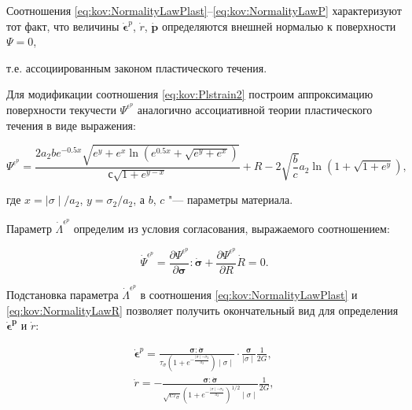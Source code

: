 Соотношения  \eqref{eq:kov:NormalityLawPlast}--\eqref{eq:kov:NormalityLawP} характеризуют тот факт, что величины $\boldsymbol{\dot{\epsilon}}^{p}$, $\dot{r}$, $\dot{\boldsymbol{p}}$  определяются внешней нормалью к поверхности $\Psi=0$,

т.е. ассоциированным законом пластического течения.



Для модификации соотношения \eqref{eq:kov:Plstrain2} построим аппроксимацию поверхности текучести $\Psi^{\epsilon^p}$ аналогично ассоциативной теории пластического течения \cite{kostina:bib:MurakamiB} в виде выражения:

$$

\Psi^{\epsilon^p}=\frac{2{a}_{2}b{e}^{-0.5x}\sqrt{{e}^{y}+{e}^{x}\ln \left({e}^{0.5x}+\sqrt{{e}^{y}+{e}^{x}} \right)}}{с\sqrt{1+{e}^{y-x}}}+R-2\sqrt{\frac{b}{c}}{a}_{2}\ln \left(1+\sqrt{1+{e}^{y}} \right), \label{eq:kov:Psiep}

$$

где $x=\mid \sigma \mid /{a}_{2}$, $y=\sigma_{2}/{a}_{2}$, а $b$, $c$ "--- параметры материала.



Параметр $\dot{\Lambda}^{\epsilon^p}$ определим из условия согласования, выражаемого соотношением:

$$

\dot{\Psi}^{\epsilon^p}=\frac{\partial{\Psi^{\epsilon^p}}}{\partial{\boldsymbol{\sigma}}}:\dot{\boldsymbol{\sigma}}+\frac{\partial \Psi^{\epsilon^p}}{\partial{R}}\dot{R}=0.

$$

Подстановка параметра $\dot{\Lambda}^{\epsilon^p}$ в соотношения \eqref{eq:kov:NormalityLawPlast} и \eqref{eq:kov:NormalityLawR} позволяет получить окончательный вид для определения $\boldsymbol{\dot{\epsilon}^{p}}$ и $\dot{r}$:

\begin{gather}

\boldsymbol{\dot{\epsilon}}^{p}= \frac{\boldsymbol{\sigma}:\dot{\boldsymbol{\sigma}}}{\tau_{\sigma}(1+e^{-\frac{\mid\sigma\mid-\sigma_{2}}{a_{2}}})\mid\sigma\mid}\cdot\frac{\boldsymbol{\sigma}}{\mid\sigma\mid}\frac{1}{2G}, \label{eq:kov:Plstrain3}\\

\dot{r}=-\frac{\boldsymbol{\sigma}:\dot{\boldsymbol{\sigma}}}{\sqrt{c\tau_{\sigma}}\left(1+e^{-\frac{\mid\sigma\mid-\sigma_{2}}{a_{2}}}\right)^{1/2}\mid\sigma\mid}\frac{1}{2G}, \label{eq:kov:R}

\end{gather}

